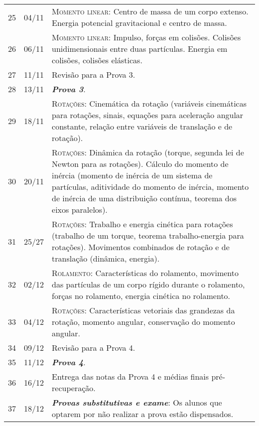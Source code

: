 \begin{center}
\begin{longtable}{ccp{70mm}}
25	 & 	04/11	 & 	\textsc{Momento linear:} Centro de massa de um corpo extenso. Energia potencial gravitacional e centro de massa. \\
26	 & 	06/11	 & 	\textsc{Momento linear:} Impulso, forças em colisões. Colisões unidimensionais entre duas partículas. Energia em colisões, colisões elásticas. \\
27	 & 	11/11	 & 	Revisão para a Prova 3. \\
28	 & 	13/11	 & 	\textbf{\textit{Prova 3}}. \\
29	 & 	18/11	 & 	\textsc{Rotações:} Cinemática da rotação (variáveis cinemáticas para rotações, sinais, equações para aceleração angular constante, relação entre variáveis de translação e de rotação). \\
30	 &  	20/11	 & 	\textsc{Rotações:} Dinâmica da rotação (torque, segunda lei de Newton para as rotações). Cálculo do momento de inércia (momento de inércia de um sistema de partículas, aditividade do momento de inércia, momento de inércia de uma distribuição contínua, teorema dos eixos paralelos). \\
31	 & 	25/27	 & 	\textsc{Rotações:} Trabalho e energia cinética para rotações (trabalho de um torque, teorema trabalho-energia para rotações). Movimentos combinados de rotação e de translação (dinâmica, energia). \\
32	 & 	02/12	 & 	\textsc{Rolamento:} Características do rolamento, movimento das partículas de um corpo rígido durante o rolamento, forças no rolamento, energia cinética no rolamento. \\
33 	 & 	04/12	 & 	\textsc{Rotações:} Características vetoriais das grandezas da rotação, momento angular, conservação do momento angular. \\
34 	 & 	09/12	 & 	Revisão para a Prova 4. \\
35 	 & 	11/12	 & 	\textbf{\textit{Prova 4}}. \\
36 	 & 	16/12	 & 	Entrega das notas da Prova 4 e médias finais pré-recuperação. \\
37 	 & 	18/12	 & 	\textbf{\textit{Provas substitutivas e exame}}: Os alunos que optarem por não realizar a prova estão dispensados. \\
\end{longtable}
\end{center}


\cleardoublepage

